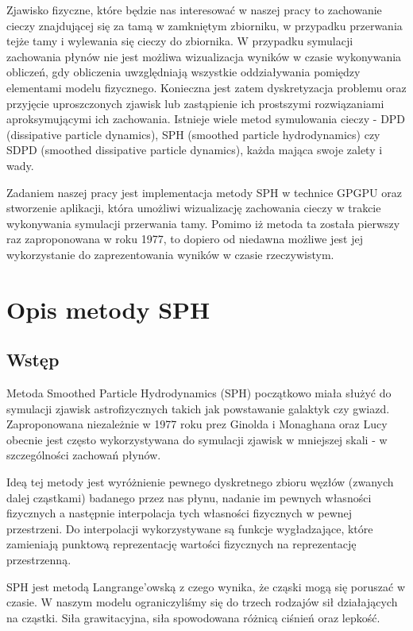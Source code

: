 \documentclass[polish, 12pt]{aghthesis}
\begin{document}
	Zjawisko fizyczne, które będzie nas interesować w naszej pracy to zachowanie cieczy znajdującej się za tamą w zamkniętym zbiorniku, w przypadku przerwania tejże tamy i wylewania się cieczy do zbiornika. W przypadku symulacji zachowania płynów nie jest możliwa wizualizacja wyników w czasie wykonywania obliczeń, gdy obliczenia uwzględniają wszystkie oddziaływania pomiędzy elementami modelu fizycznego. Konieczna jest zatem dyskretyzacja problemu oraz przyjęcie uproszczonych zjawisk lub zastąpienie ich prostszymi rozwiązaniami aproksymującymi ich zachowania. Istnieje wiele metod symulowania cieczy - DPD (dissipative particle dynamics), SPH (smoothed particle hydrodynamics) czy SDPD (smoothed dissipative particle dynamics), każda mająca swoje zalety i wady.

	Zadaniem naszej pracy jest implementacja metody SPH w technice GPGPU oraz stworzenie aplikacji, która umożliwi wizualizację zachowania cieczy w trakcie wykonywania symulacji przerwania tamy. Pomimo iż metoda ta została pierwszy raz zaproponowana w roku 1977, to dopiero od niedawna możliwe jest jej wykorzystanie do zaprezentowania wyników w czasie rzeczywistym.

\section{Opis metody SPH}
\subsection{Wstęp}
			
			Metoda Smoothed Particle Hydrodynamics (SPH) początkowo miała służyć do symulacji zjawisk astrofizycznych takich jak powstawanie galaktyk czy gwiazd. Zaproponowana niezależnie w 1977 roku prez Ginolda i Monaghana oraz Lucy obecnie jest często wykorzystywana do symulacji zjawisk w mniejszej skali - w szczególności zachowań płynów. 

			Ideą tej metody jest wyróżnienie pewnego dyskretnego zbioru węzłów (zwanych dalej cząstkami) badanego przez nas płynu, nadanie im pewnych własności fizycznych a następnie interpolacja tych własności fizycznych w pewnej przestrzeni. Do interpolacji wykorzystywane są funkcje wygładzające, które zamieniają punktową reprezentację wartości fizycznych na reprezentację przestrzenną.

			SPH jest metodą Langrange'owską z czego wynika, że cząski mogą się poruszać w czasie. W naszym modelu ograniczyliśmy się do trzech rodzajów sił działających na cząstki. Siła grawitacyjna, siła spowodowana różnicą ciśnień oraz lepkość.
\end{document}
